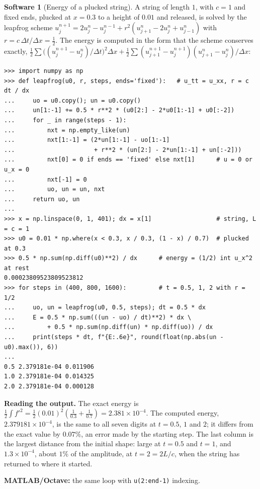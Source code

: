\documentclass[11pt,a4paper]{article}
\numberwithin{equation}{section}
\theoremstyle{definition}
\newtheorem{software}[thm]{Software}
\begin{document}
\begin{software}[Energy of a plucked string]
\label{sw:pluck}
A string of length $1$, with $c = 1$ and fixed ends, plucked at $x = 0.3$ to a height of $0.01$ and released, is solved by the leapfrog scheme $u_j^{n+1} = 2u_j^n - u_j^{n-1} + r^2(u_{j+1}^n - 2u_j^n + u_{j-1}^n)$ with $r = c\,\Delta t/\Delta x = \frac12$. The energy is computed in the form that the scheme
conserves exactly, $\frac12\sum\bigl((u_j^{n+1} - u_j^n)/\Delta t\bigr)^2\Delta x + \frac12\sum(u_{j+1}^{n+1} - u_j^{n+1})(u_{j+1}^n - u_j^n)/\Delta x$:
{\small\begin{verbatim}
>>> import numpy as np
>>> def leapfrog(u0, r, steps, ends='fixed'):   # u_tt = u_xx, r = c dt / dx
...     uo = u0.copy(); un = u0.copy()
...     un[1:-1] += 0.5 * r**2 * (u0[2:] - 2*u0[1:-1] + u0[:-2])
...     for _ in range(steps - 1):
...         nxt = np.empty_like(un)
...         nxt[1:-1] = (2*un[1:-1] - uo[1:-1]
...                      + r**2 * (un[2:] - 2*un[1:-1] + un[:-2]))
...         nxt[0] = 0 if ends == 'fixed' else nxt[1]      # u = 0 or u_x = 0
...         nxt[-1] = 0
...         uo, un = un, nxt
...     return uo, un
...
>>> x = np.linspace(0, 1, 401); dx = x[1]                  # string, L = c = 1
>>> u0 = 0.01 * np.where(x < 0.3, x / 0.3, (1 - x) / 0.7)  # plucked at 0.3
>>> 0.5 * np.sum(np.diff(u0)**2) / dx      # energy = (1/2) int u_x^2 at rest
0.00023809523809523812
>>> for steps in (400, 800, 1600):         # t = 0.5, 1, 2 with r = 1/2
...     uo, un = leapfrog(u0, 0.5, steps); dt = 0.5 * dx
...     E = 0.5 * np.sum(((un - uo) / dt)**2) * dx \
...         + 0.5 * np.sum(np.diff(un) * np.diff(uo)) / dx
...     print(steps * dt, f"{E:.6e}", round(float(np.abs(un - u0).max()), 6))
...
0.5 2.379181e-04 0.011906
1.0 2.379181e-04 0.014325
2.0 2.379181e-04 0.000128
\end{verbatim}}
\textbf{Reading the output.} The exact energy is $\frac12\int f'^2 = \frac12(0.01)^2(\frac1{0.3} + \frac1{0.7}) = 2.381 \times 10^{-4}$. The computed energy, $2.379181 \times 10^{-4}$, is the same to all seven digits at $t = 0.5$, $1$ and $2$; it differs from the exact value by $0.07\%$, an error made by the
starting step. The last column is the largest distance from the initial shape: large at $t = 0.5$ and $t = 1$, and $1.3 \times 10^{-4}$, about $1\%$ of the amplitude, at $t = 2 = 2L/c$, when the string has returned to where it started.

\textbf{MATLAB/Octave:} the same loop with \texttt{u(2:end-1)} indexing.
\end{software}
\end{document}
